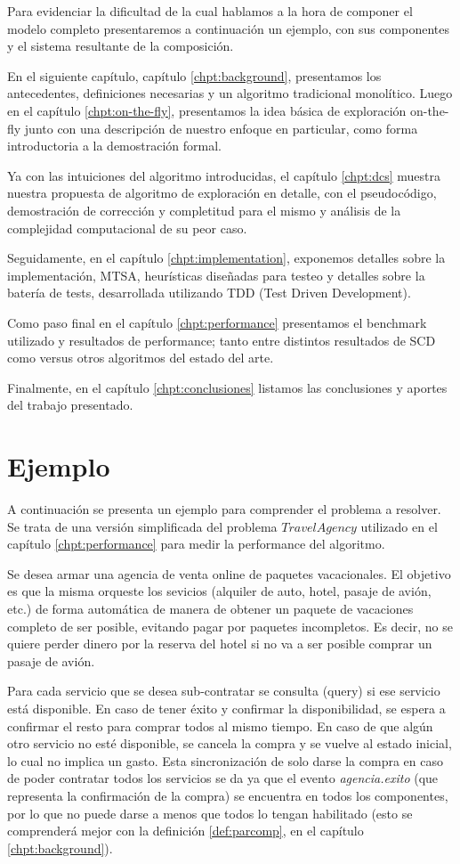 Para evidenciar la dificultad de la cual hablamos a la hora de componer el modelo completo presentaremos a continuación un ejemplo, con sus componentes y el sistema resultante de la composición.

En el siguiente capítulo, capítulo \ref{chpt:background}, presentamos los antecedentes, definiciones necesarias y un algoritmo tradicional monolítico. Luego en el capítulo \ref{chpt:on-the-fly}, presentamos la idea básica de exploración on-the-fly junto con una descripción de nuestro enfoque en particular, como forma introductoria a la demostración formal.

Ya con las intuiciones del algoritmo introducidas, el capítulo \ref{chpt:dcs} muestra nuestra propuesta de algoritmo de exploración en detalle, con el pseudocódigo, demostración de corrección y completitud para el mismo y análisis de la complejidad computacional de su peor caso.

Seguidamente, en el capítulo \ref{chpt:implementation}, exponemos detalles sobre la implementación, MTSA, heurísticas diseñadas para testeo y detalles sobre la batería de tests, desarrollada utilizando TDD (Test Driven Development).

Como paso final en el capítulo \ref{chpt:performance} presentamos el benchmark utilizado y resultados de performance; tanto entre distintos resultados de SCD como versus otros algoritmos del estado del arte.

Finalmente, en el capítulo \ref{chpt:conclusiones} listamos las conclusiones y aportes del trabajo presentado.


\section{Ejemplo}\label{chpt:casoAviones}
A continuación se presenta un ejemplo para comprender el problema a resolver. Se trata de una versión simplificada del problema $Travel Agency$ utilizado en el capítulo \ref{chpt:performance} para medir la performance del algoritmo.

Se desea armar una agencia de venta online de paquetes vacacionales. El objetivo es que la misma orqueste los sevicios (alquiler de auto, hotel, pasaje de avión, etc.) de forma automática de manera de obtener un paquete de vacaciones completo de ser posible, evitando pagar por paquetes incompletos. Es decir, no se quiere perder dinero por la reserva del hotel si no va a ser posible comprar un pasaje de avión.

Para cada servicio que se desea sub-contratar se consulta (query) si ese servicio está disponible. En caso de tener éxito y confirmar la disponibilidad, se espera a confirmar el resto para comprar todos al  mismo tiempo. En caso de que algún otro servicio no esté disponible, se cancela la compra y se vuelve al estado inicial, lo cual no implica un gasto. Esta sincronización de solo darse la compra en caso de poder contratar todos los servicios se da ya que el evento \textit{agencia.exito} (que representa la confirmación de la compra) se encuentra en todos los componentes, por lo que no puede darse a menos que todos lo tengan habilitado (esto se comprenderá mejor con la definición \ref{def:parcomp}, en el capítulo \ref{chpt:background}).

